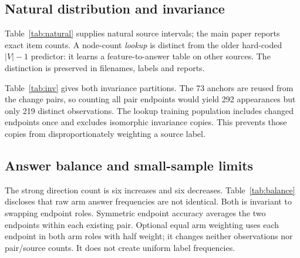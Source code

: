 \documentclass[10pt,twocolumn,letterpaper]{article}
\begin{document}
\begin{table}[H]
\centering\small
\caption{Natural graph source-macro accuracy in percent, with
descriptive whole-source percentile intervals. All 73 items and
24 sources are retained. Lookup training excludes the test source
and is separate from hypothetical graphs.}
\label{tab:natural}

\end{table}

\subsection{Natural distribution and invariance}
Table~\ref{tab:natural} supplies natural source intervals; the main
paper reports exact item counts. A node-count \emph{lookup} is
distinct from the older hard-coded $|V|-1$ predictor: it learns a
feature-to-answer table on other sources. The distinction is preserved
in filenames, labels and reports.

Table~\ref{tab:inv} gives both invariance partitions. The 73 anchors
are reused from the change pairs, so counting all pair endpoints
would yield 292 appearances but only 219 distinct observations.
The lookup training population includes changed endpoints once and
excludes isomorphic invariance copies. This prevents those copies
from disproportionately weighting a source label.

\begin{table}[H]
\centering\small
\caption{Both-correct on invariance pairs. Strong and degree-visible
sources overlap with the corresponding changed-answer partitions.
Stable predictions need not be correct.}
\label{tab:inv}

\end{table}

\subsection{Answer balance and small-sample limits}
The strong direction count is six increases and six decreases.
Table~\ref{tab:balance} discloses that raw arm answer frequencies
are not identical. Both is invariant to swapping endpoint roles.
Symmetric endpoint accuracy averages the two endpoints within
each existing pair. Optional equal arm weighting uses each endpoint
in both arm roles with half weight; it changes neither observations
nor pair/source counts. It does not create uniform label frequencies.

\begin{table}[H]
\centering\small
\caption{Stored strong-change answer histograms. Equal numbers of
increases/decreases do not imply equal per-answer arm frequencies.}
\label{tab:balance}

\end{table}
\end{document}
